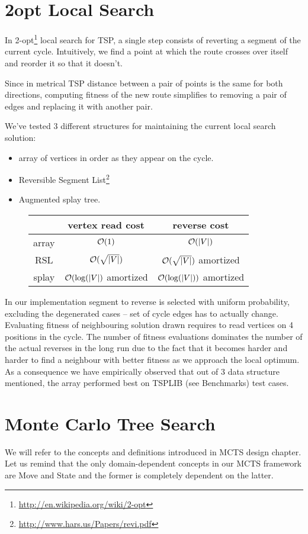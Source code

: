 \section{2opt Local Search}

In 2-opt\footnote{\url{http://en.wikipedia.org/wiki/2-opt}} local search for TSP, a single step
consists of reverting a segment of the current cycle. Intuitively, we find a point
at which the route crosses over itself and reorder it so that it doesn't.

Since in metrical TSP distance between a pair of points is the same for both directions,
computing fitness of the new route simplifies to removing a pair of edges and replacing it with another
pair.

We've tested 3 different structures for maintaining the current local search solution:
\begin{itemize}
\item array of vertices in order as they appear on the cycle.
\item Reversible Segment List\footnote{\url{http://www.hars.us/Papers/revi.pdf}}
\item Augmented splay tree.
\end{itemize}
\begin{figure}[!h]
\begin{tabular}{c|cc}
& vertex read cost & reverse cost \\\hline
array & $\mathcal{O}(1)$ & $\mathcal{O}(|V|)$ \\
RSL & $\mathcal{O}(\sqrt{|V|})$ & $\mathcal{O}(\sqrt{|V|})$ amortized \\
splay & $\mathcal{O}(\log(|V|)$ amortized & $\mathcal{O}(\log(|V|))$ amortized
\end{tabular}
\end{figure}
In our implementation segment to reverse is selected with uniform probability,
excluding the degenerated cases -- set of cycle edges has to actually change.
Evaluating fitness of neighbouring solution drawn requires to read vertices
on 4 positions in the cycle. The number of fitness evaluations dominates
the number of the actual reverses in the long run due to the fact that it
becomes harder and harder to find a neighbour with better fitness as we approach
the local optimum. As a consequence we have empirically observed that out of
3 data structure mentioned, the array performed best on TSPLIB (see Benchmarks)
test cases.

\section{Monte Carlo Tree Search}
We will refer to the concepts and definitions introduced in MCTS design
chapter. Let us remind that the only domain-dependent concepts in our MCTS
framework are Move and State and the former is completely dependent on the
latter.


